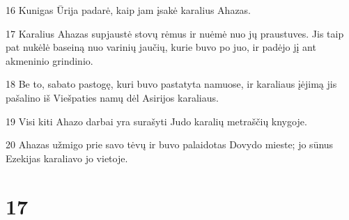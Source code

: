 \par 16 Kunigas Ūrija padarė, kaip jam įsakė karalius Ahazas. 
\par 17 Karalius Ahazas supjaustė stovų rėmus ir nuėmė nuo jų praustuves. Jis taip pat nukėlė baseiną nuo varinių jaučių, kurie buvo po juo, ir padėjo jį ant akmeninio grindinio. 
\par 18 Be to, sabato pastogę, kuri buvo pastatyta namuose, ir karaliaus įėjimą jis pašalino iš Viešpaties namų dėl Asirijos karaliaus. 
\par 19 Visi kiti Ahazo darbai yra surašyti Judo karalių metraščių knygoje. 
\par 20 Ahazas užmigo prie savo tėvų ir buvo palaidotas Dovydo mieste; jo sūnus Ezekijas karaliavo jo vietoje.



\chapter{17}

